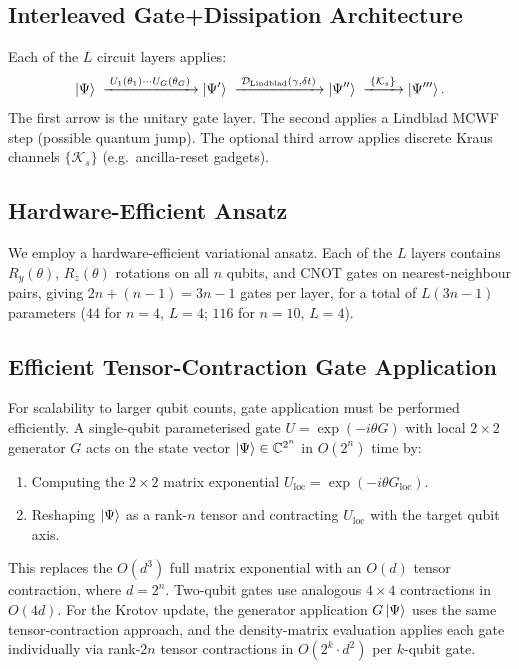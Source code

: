 \documentclass[11pt,a4paper]{article}
\begin{document}
\subsection{Interleaved Gate+Dissipation Architecture}

Each of the $L$ circuit layers applies:
\begin{equation}
\ket{\Psi} \;\xrightarrow{\;U_1(\theta_1)\cdots U_G(\theta_G)\;}
\ket{\Psi'} \;\xrightarrow{\;\mathcal{D}_\mathrm{Lindblad}(\gamma,\delta t)\;}
\ket{\Psi''} \;\xrightarrow{\;\{\mathcal{K}_s\}\;}
\ket{\Psi'''}.
\end{equation}
The first arrow is the unitary gate layer.  The second applies a
Lindblad MCWF step (possible quantum jump).  The optional third
arrow applies discrete Kraus channels $\{\mathcal{K}_s\}$
(e.g.\ ancilla-reset gadgets).

\subsection{Hardware-Efficient Ansatz}

We employ a hardware-efficient variational ansatz.
Each of the $L$ layers contains $R_y(\theta)$,
$R_z(\theta)$ rotations on all $n$ qubits, and CNOT gates on
nearest-neighbour pairs, giving
$2n + (n-1) = 3n - 1$ gates per layer, for a total of $L(3n-1)$
parameters ($44$ for $n=4$, $L=4$; $116$ for $n=10$, $L=4$).

\subsection{Efficient Tensor-Contraction Gate Application}

For scalability to larger qubit counts, gate application must be
performed efficiently.  A single-qubit parameterised gate
$U = \exp(-i\theta G)$ with local $2\times 2$ generator $G$ acts on the
state vector $\ket{\Psi} \in \mathbb{C}^{2^n}$ in $O(2^n)$ time by:
\begin{enumerate}[nosep]
\item Computing the $2\times 2$ matrix exponential
  $U_\text{loc} = \exp(-i\theta G_\text{loc})$.
\item Reshaping $\ket{\Psi}$ as a rank-$n$ tensor and contracting
  $U_\text{loc}$ with the target qubit axis.
\end{enumerate}
This replaces the $O(d^3)$ full matrix exponential with an $O(d)$
tensor contraction, where $d = 2^n$.  Two-qubit gates use analogous
$4\times 4$ contractions in $O(4d)$.  For the Krotov update, the
generator application $G\ket{\Psi}$ uses the same tensor-contraction
approach, and the density-matrix evaluation applies each gate
individually via rank-$2n$ tensor contractions in $O(2^k \cdot d^2)$
per $k$-qubit gate.
\end{document}
